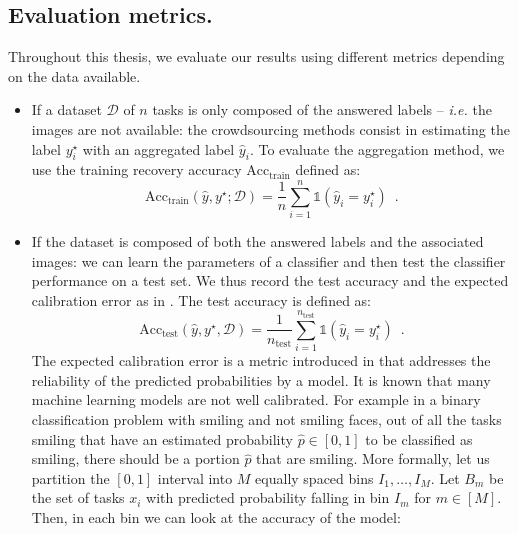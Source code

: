 \subsection{Evaluation metrics.}
\label{sub:evaluation-metrics}
Throughout this thesis, we evaluate our results using different metrics depending on the data available.
\begin{itemize}
    \item If a dataset $\mathcal{D}$ of $n$ tasks is only composed of the answered labels -- \emph{i.e.} the images are not available: the crowdsourcing methods consist in estimating the label $y^\star_i$ with an aggregated label $\hat y_i$. To evaluate the aggregation method, we use the training recovery accuracy $\mathrm{Acc}_{\text{train}}$ defined as:
    \begin{equation}\label{eq:acctrain}
        \mathrm{Acc}_{\text{train}}(\hat y, y^\star; \mathcal{D}) = \frac{1}{n} \sum_{i=1}^{n} \mathds{1}(\hat y_i = y^\star_i)\enspace.
    \end{equation}
    \item If the dataset is composed of both the answered labels and the associated images: we can learn the parameters of a classifier and then test the classifier performance on a test set. We thus record the test accuracy and the expected calibration error as in \citet{guo_calibration_2017}. The test accuracy is defined as:
        \begin{equation}\label{eq:acctest}
        \mathrm{Acc}_{\text{test}}(\hat y, y^\star,\mathcal{D}) = \frac{1}{n_{\text{test}}}\sum_{i=1}^{n_\text{test}} \mathds{1}(\hat y_i = y^\star_i)\enspace.
    \end{equation}
    The expected calibration error is a metric introduced in \citet{naeini2015obtaining} that addresses the reliability of the predicted probabilities by a model.
    It is known that many machine learning models \citep{guo_calibration_2017} are not well calibrated.
    For example in a binary classification problem with smiling and not smiling faces, out of all the tasks smiling that have an estimated probability $\hat p\in [0,1]$ to be classified as smiling, there should be a portion $\hat p$ that are smiling.
    More formally, let us partition the $[0,1]$ interval into $M$ equally spaced bins $I_1,\dots,I_M$.
    Let $B_m$ be the set of tasks $x_i$ with predicted probability falling in bin $I_m$ for $m\in [M]$.
    Then, in each bin we can look at the accuracy of the model:
    \begin{equation}\label{eq:accuracyBm}

\end{equation}
\end{itemize}
